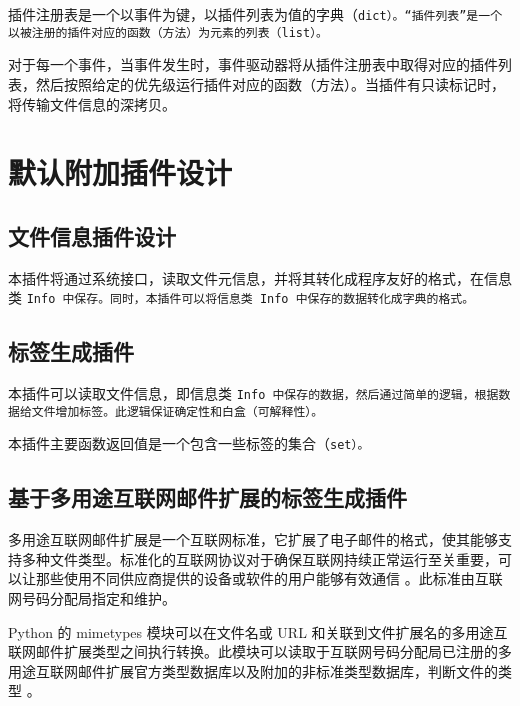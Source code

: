 插件注册表是一个以事件为键，以插件列表为值的字典（\tt{dict}）。“插件列表”是一个以被注册的插件对应的函数（方法）为元素的列表（\tt{list}）。

对于每一个事件，当事件发生时，事件驱动器将从插件注册表中取得对应的插件列表，然后按照给定的优先级运行插件对应的函数（方法）。当插件有只读标记时，将传输文件信息的深拷贝。

\section{默认附加插件设计}

\subsection{文件信息插件设计}

本插件将通过系统接口，读取文件元信息，并将其转化成程序友好的格式，在信息类 \tt{Info} 中保存。同时，本插件可以将信息类 \tt{Info} 中保存的数据转化成字典的格式。

\subsection{标签生成插件}

本插件可以读取文件信息，即信息类 \tt{Info} 中保存的数据，然后通过简单的逻辑，根据数据给文件增加标签。此逻辑保证确定性和白盒（可解释性）。

本插件主要函数返回值是一个包含一些标签的集合（\tt{set}）。

\subsection{基于多用途互联网邮件扩展的标签生成插件}

多用途互联网邮件扩展是一个互联网标准，它扩展了电子邮件的格式，使其能够支持多种文件类型。标准化的互联网协议对于确保互联网持续正常运行至关重要，可以让那些使用不同供应商提供的设备或软件的用户能够有效通信 \cite{iana}。此标准由互联网号码分配局指定和维护。

Python 的 mimetypes 模块可以在文件名或 URL 和关联到文件扩展名的多用途互联网邮件扩展类型之间执行转换。此模块可以读取于互联网号码分配局已注册的多用途互联网邮件扩展官方类型数据库以及附加的非标准类型数据库，判断文件的类型 \cite{py_doc}。
